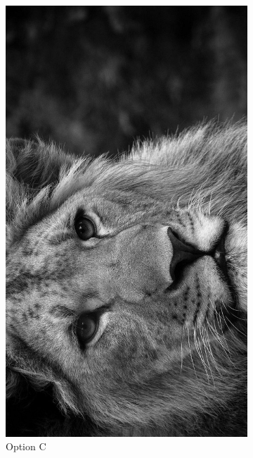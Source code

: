 \documentclass{ximera}
\begin{document}
\begin{problem}
\begin{figure}[h]
  \centering
  \begin{subfigure}[b]{0.35\textwidth}
    \centering
    \includegraphics[width=\textwidth]{test_image_rot_1.jpg}
    \caption{Option C}
    \label{fig:optionC}
  \end{subfigure}
  \hfill
  \begin{subfigure}[b]{0.35\textwidth}
    \centering

\end{subfigure}
\end{figure}
\end{problem}
\end{document}
